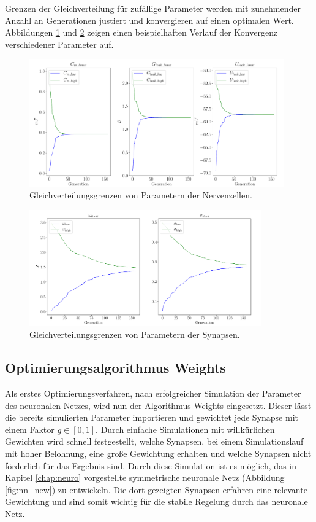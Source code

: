 		Grenzen der Gleichverteilung für zufällige Parameter werden mit zunehmender Anzahl an Generationen justiert und konvergieren auf einen optimalen Wert. Abbildungen \ref{fig:ga_1} und \ref{fig:ga_2} zeigen einen beispielhaften Verlauf der Konvergenz verschiedener Parameter auf.
		\begin{figure}[H]
			\centering
			\includegraphics[width=11cm]{figures/chap_implement/ga_neuron.pdf}
			\caption{Gleichverteilungsgrenzen von Parametern der Nervenzellen.}
			\label{fig:ga_1}
		\end{figure}
		\begin{figure}[H]
			\centering
			\includegraphics[width=10cm]{figures/chap_implement/ga_synapse.pdf}
			\caption{Gleichverteilungsgrenzen von Parametern der Synapsen.}
			\label{fig:ga_2}
		\end{figure}
	
	\subsection{Optimierungsalgorithmus Weights}
		Als erstes Optimierungsverfahren, nach erfolgreicher Simulation der Parameter des neuronalen Netzes, wird nun der Algorithmus Weights eingesetzt. Dieser lässt die bereits simulierten Parameter importieren und gewichtet jede Synapse mit einem Faktor $g\in[0,1]$. Durch einfache Simulationen mit willkürlichen Gewichten wird schnell festgestellt, welche Synapsen, bei einem Simulationslauf mit hoher Belohnung, eine große Gewichtung erhalten und welche Synapsen nicht förderlich für das Ergebnis sind. Durch diese Simulation ist es möglich, das in Kapitel \ref{chap:neuro} vorgestellte symmetrische neuronale Netz (Abbildung \ref{fig:nn_new}) zu entwickeln. Die dort gezeigten Synapsen erfahren eine relevante Gewichtung und sind somit wichtig für die stabile Regelung durch das neuronale Netz.
		
